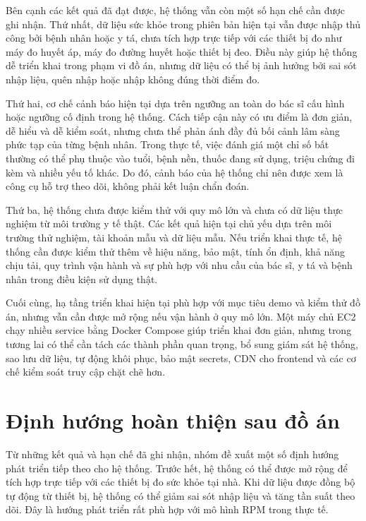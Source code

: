 \par Bên cạnh các kết quả đã đạt được, hệ thống vẫn còn một số hạn chế cần được ghi nhận. Thứ nhất, dữ liệu sức khỏe trong phiên bản hiện tại vẫn được nhập thủ công bởi bệnh nhân hoặc y tá, chưa tích hợp trực tiếp với các thiết bị đo như máy đo huyết áp, máy đo đường huyết hoặc thiết bị đeo. Điều này giúp hệ thống dễ triển khai trong phạm vi đồ án, nhưng dữ liệu có thể bị ảnh hưởng bởi sai sót nhập liệu, quên nhập hoặc nhập không đúng thời điểm đo.

\par Thứ hai, cơ chế cảnh báo hiện tại dựa trên ngưỡng an toàn do bác sĩ cấu hình hoặc ngưỡng cố định trong hệ thống. Cách tiếp cận này có ưu điểm là đơn giản, dễ hiểu và dễ kiểm soát, nhưng chưa thể phản ánh đầy đủ bối cảnh lâm sàng phức tạp của từng bệnh nhân. Trong thực tế, việc đánh giá một chỉ số bất thường có thể phụ thuộc vào tuổi, bệnh nền, thuốc đang sử dụng, triệu chứng đi kèm và nhiều yếu tố khác. Do đó, cảnh báo của hệ thống chỉ nên được xem là công cụ hỗ trợ theo dõi, không phải kết luận chẩn đoán.

\par Thứ ba, hệ thống chưa được kiểm thử với quy mô lớn và chưa có dữ liệu thực nghiệm từ môi trường y tế thật. Các kết quả hiện tại chủ yếu dựa trên môi trường thử nghiệm, tài khoản mẫu và dữ liệu mẫu. Nếu triển khai thực tế, hệ thống cần được kiểm thử thêm về hiệu năng, bảo mật, tính ổn định, khả năng chịu tải, quy trình vận hành và sự phù hợp với nhu cầu của bác sĩ, y tá và bệnh nhân trong điều kiện sử dụng thật.

\par Cuối cùng, hạ tầng triển khai hiện tại phù hợp với mục tiêu demo và kiểm thử đồ án, nhưng vẫn cần được mở rộng nếu vận hành ở quy mô lớn. Một máy chủ EC2 chạy nhiều service bằng Docker Compose giúp triển khai đơn giản, nhưng trong tương lai có thể cần tách các thành phần quan trọng, bổ sung giám sát hệ thống, sao lưu dữ liệu, tự động khôi phục, bảo mật secrets, CDN cho frontend và các cơ chế kiểm soát truy cập chặt chẽ hơn.

\section{Định hướng hoàn thiện sau đồ án}

\par Từ những kết quả và hạn chế đã ghi nhận, nhóm đề xuất một số định hướng phát triển tiếp theo cho hệ thống. Trước hết, hệ thống có thể được mở rộng để tích hợp trực tiếp với các thiết bị đo sức khỏe tại nhà. Khi dữ liệu được đồng bộ tự động từ thiết bị, hệ thống có thể giảm sai sót nhập liệu và tăng tần suất theo dõi. Đây là hướng phát triển rất phù hợp với mô hình RPM trong thực tế.

